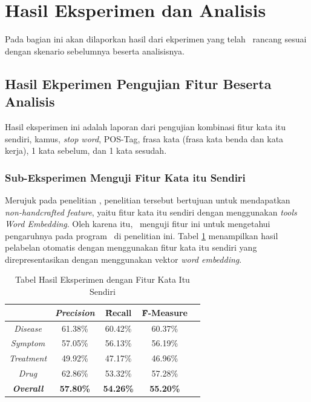 \section{Hasil Eksperimen dan Analisis}
Pada bagian ini akan dilaporkan hasil dari ekperimen yang telah \saya~rancang sesuai dengan skenario sebelumnya beserta analisisnya. 
	\subsection{Hasil Ekperimen Pengujian Fitur Beserta Analisis}
	
	Hasil eksperimen ini adalah laporan dari pengujian kombinasi fitur kata itu sendiri, kamus, \textit{stop word}, POS-Tag, frasa kata (frasa kata benda dan kata kerja), 1 kata sebelum, dan 1 kata sesudah.
	  
	\subsubsection{Sub-Eksperimen Menguji Fitur Kata itu Sendiri}
	Merujuk pada penelitian \cite{mujiono2016new}, penelitian tersebut bertujuan untuk mendapatkan \textit{non-handcrafted feature}, yaitu fitur kata itu sendiri dengan menggunakan \textit{tools Word Embedding}. Oleh karena itu, \saya~menguji fitur ini untuk mengetahui pengaruhnya pada program \mer~di penelitian ini. Tabel \ref{table:own1} menampilkan hasil pelabelan otomatis dengan menggunakan fitur kata itu sendiri yang direpresentasikan dengan menggunakan vektor \textit{word embedding}.
	
	\begin{table}
	    \centering
	    \caption{Tabel Hasil Eksperimen dengan Fitur Kata Itu Sendiri}
	    \begin{tabular}{|c|c|c|c|c|}
	      \hline
						      & \textit{Precision} & \f{\f{Recall}} & \f{\f{F-Measure}} \\ \hline
	      \textit{Disease}    & 61.38\%             & 60.42\%        & 60.37\%           \\ \hline
	      \textit{Symptom}    & 57.05\%             & 56.13\%        & 56.19\%           \\ \hline
	      \textit{Treatment}  & 49.92\%             & 47.17\%        & 46.96\%           \\ \hline
	      \textit{Drug}		  & 62.86\%             & 53.32\%        & 57.28\%           \\ \hline
	      \textit{\textbf{Overall}}&\textbf{ 57.80\%}& \textbf{54.26\%}& \textbf{55.20\%}\\ \hline
	    \end{tabular}
	    \label{table:own1}
	\end{table}

